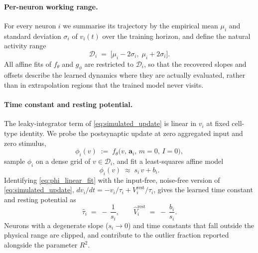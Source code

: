 \documentclass{article}
\begin{document}
\paragraph{Per-neuron working range.}
For every neuron $i$ we summarise its trajectory by the empirical
mean $\mu_i$ and standard deviation $\sigma_i$ of $v_i(t)$ over
the training horizon, and define the natural activity range
\begin{equation}
    \mathcal{D}_i \;=\; \big[\mu_i - 2\sigma_i,\; \mu_i + 2\sigma_i\big].
    \label{eq:extraction_range}
\end{equation}
All affine fits of $f_\theta$ and $g_\phi$ are restricted to
$\mathcal{D}_i$, so that the recovered slopes and offsets describe
the learned dynamics where they are actually evaluated, rather than
in extrapolation regions that the trained model never visits.

\paragraph{Time constant and resting potential.}
The leaky-integrator term of \cref{eq:simulated_update} is
linear in $v_i$ at fixed cell-type identity. We probe the
postsynaptic update at zero aggregated input and zero stimulus,
\begin{equation}
    \phi_i(v) \;:=\; f_\theta\!\big(v,\,\mathbf{a}_i,\,m=0,\,I=0\big),
\end{equation}
sample $\phi_i$ on a dense grid of $v\in\mathcal{D}_i$, and fit a
least-squares affine model
\begin{equation}
    \phi_i(v) \;\approx\; s_i\,v + b_i.
    \label{eq:phi_linear_fit}
\end{equation}
Identifying \cref{eq:phi_linear_fit} with the input-free,
noise-free version of \cref{eq:simulated_update},
$dv_i/dt = -v_i/\tau_i + V_i^{\mathrm{rest}}/\tau_i$, gives the
learned time constant and resting potential as
\begin{equation}
    \hat{\tau}_i \;=\; -\,\frac{1}{s_i},
    \qquad
    \hat{V}^{\mathrm{rest}}_i \;=\; -\,\frac{b_i}{s_i}.
    \label{eq:tau_vrest_extraction}
\end{equation}
Neurons with a degenerate slope ($s_i \to 0$) and time constants
that fall outside the physical range are clipped, and contribute
to the outlier fraction reported alongside the parameter $R^2$.
\end{document}
